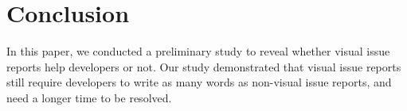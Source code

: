\section{Conclusion}
\label{sec:conclusion}

In this paper, we conducted a preliminary study to reveal  
whether visual issue reports help developers or not. 
Our study demonstrated that visual issue reports still 
require developers to write as many words as non-visual issue reports, 
and need a longer time to be resolved. 




